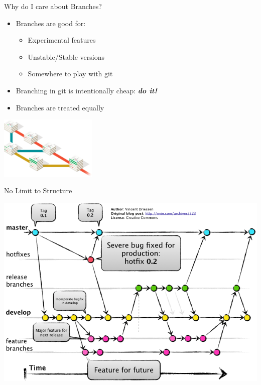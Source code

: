 \documentclass[aspectratio=43]{beamer}
\begin{document}
\begin{frame}{Why do I care about Branches?}
    \begin{itemize}
    \item Branches are good for:
        \begin{itemize}
        \item Experimental features
        \item Unstable/Stable versions
        \item Somewhere to play with git
        \end{itemize}
    \item Branching in git is intentionally cheap: \textit{\textbf{do it!}}
    \item Branches are treated equally
    \end{itemize}
    
    \begin{center}
        \includegraphics[height=3cm]{resources/branching_illustration.png}
    \end{center}
\end{frame}

\begin{frame}{No Limit to Structure}
    \begin{center}
        \includegraphics[width=.9\linewidth]{resources/branching_complex.png}
    \end{center}
\end{frame}
\end{document}
